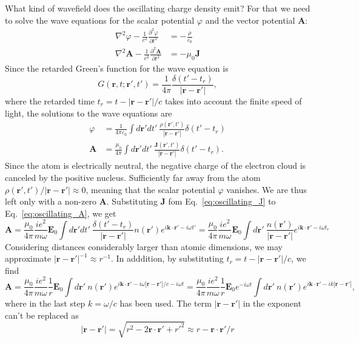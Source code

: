 What kind of wavefield does the oscillating charge density emit? For that we need to solve the wave equations for the scalar potential $\varphi$ and the vector potential $\mathbf{A}$:
\begin{align}
\nabla^2 \varphi - \frac{1}{c^2}\frac{\partial^2 \varphi}{\partial t^2} &= -\frac{\rho}{\varepsilon_0} \\
\nabla^2 \mathbf{A} - \frac{1}{c^2}\frac{\partial^2 \mathbf{A}}{\partial t^2} &= -\mu_0 \mathbf{J}
\end{align}
Since the retarded Green's function for the wave equation is 
\begin{equation}
G(\mathbf{r},t;\mathbf{r}',t') = \frac{1}{4 \pi} \frac{\delta(t'-t_r)}{|\mathbf{r}-\mathbf{r}'|},
\end{equation}
where the retarded time $t_r = t - |\mathbf{r}-\mathbf{r}'|/c$ takes into account the finite speed of light, the solutions to the wave equations are 
\begin{align}
\varphi &= \frac{1}{4 \pi \varepsilon_0}\int d\mathbf{r}' dt' \  \frac{\rho(\mathbf{r}',t')}{|\mathbf{r}-\mathbf{r}'|} \delta(t'-t_r) \\
\mathbf{A} &= \frac{\mu_0}{4 \pi}\int d\mathbf{r}' dt' \  \frac{\mathbf{J}(\mathbf{r}',t')}{|\mathbf{r}-\mathbf{r}'|} \delta(t'-t_r).\label{eq:oscillating_A}
\end{align}
Since the atom is electrically neutral, the negative charge of the electron cloud is canceled by the positive nucleus. Sufficiently far away from the atom $\rho(\mathbf{r}',t')/|\mathbf{r}-\mathbf{r}'| \approx 0$, meaning that the scalar potential $\varphi$ vanishes. We are thus left only with a non-zero $\mathbf{A}$. Substituting $\mathbf{J}$ fom Eq.~\eqref{eq:oscillating_J} to Eq.~\eqref{eq:oscillating_A}, we get
\begin{equation}
\mathbf{A} = \frac{\mu_0}{4 \pi} \frac{ie^2}{m\omega} \mathbf{E}_0 \int d\mathbf{r}' dt' \  \frac{\delta(t'-t_r)}{|\mathbf{r}-\mathbf{r}'|} n(\mathbf{r}') e^{i \mathbf{k}\cdot\mathbf{r}'-i \omega t'} = \frac{\mu_0}{4 \pi} \frac{ie^2}{m\omega} \mathbf{E}_0 \int d\mathbf{r}' \  \frac{n(\mathbf{r}')}{|\mathbf{r}-\mathbf{r}'|}  e^{i \mathbf{k}\cdot\mathbf{r}'-i \omega t_r}
\end{equation}
Considering distances considerably larger than atomic dimensions, we may approximate $|\mathbf{r}-\mathbf{r}'|^{-1} \approx r^{-1}$. In adddition, by substituting $t_r = t - |\mathbf{r}-\mathbf{r}'|/c$, we find
\begin{equation}
\mathbf{A} = \frac{\mu_0}{4 \pi} \frac{ie^2}{m\omega}\frac{1}{r} \mathbf{E}_0  \int d\mathbf{r}' \  n(\mathbf{r}')  e^{i \mathbf{k}\cdot\mathbf{r}'-i \omega |\mathbf{r}-\mathbf{r}'|/c -i \omega t} = \frac{\mu_0}{4 \pi} \frac{ie^2}{m\omega}\frac{1}{r} \mathbf{E}_0  e^{-i \omega t} \int d\mathbf{r}' \  n(\mathbf{r}')  e^{i \mathbf{k}\cdot\mathbf{r}'-i k |\mathbf{r}-\mathbf{r}'|},
\end{equation}
where in the last step $k=\omega/c$ has been used. The term $|\mathbf{r}-\mathbf{r}'|$ in the exponent can't be replaced as
\begin{equation}
|\mathbf{r}-\mathbf{r}'| = \sqrt{r^2 -2\mathbf{r}\cdot\mathbf{r}' +r'^2} \approx
r - \mathbf{r}\cdot\mathbf{r}'/r
\end{equation}

%
%
 